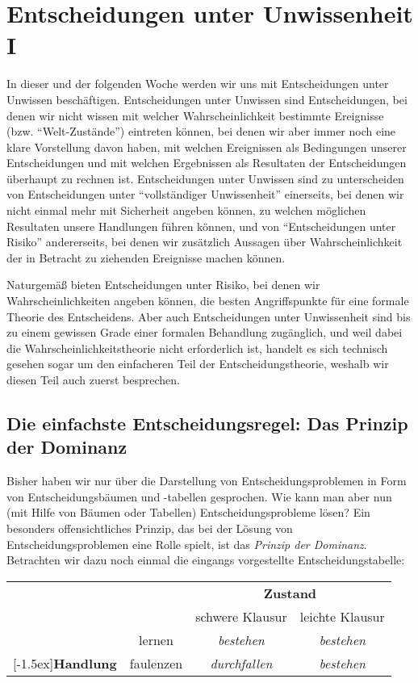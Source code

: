 \section{Entscheidungen unter Unwissenheit I}

In dieser und der folgenden Woche werden wir uns mit Entscheidungen unter
Unwissen beschäftigen. Entscheidungen unter Unwissen sind
Entscheidungen, bei denen wir nicht wissen mit welcher Wahrscheinlichkeit
bestimmte Ereignisse (bzw. "`Welt-Zustände"') eintreten können, bei denen wir
aber immer noch eine klare Vorstellung davon haben, mit welchen Ereignissen
als Bedingungen unserer Entscheidungen und mit welchen Ergebnissen als
Resultaten der Entscheidungen überhaupt zu rechnen ist. Entscheidungen unter
Unwissen sind zu unterscheiden von Entscheidungen unter "`vollständiger
Unwissenheit"' einerseits, bei denen wir nicht einmal mehr mit Sicherheit
angeben können, zu welchen möglichen Resultaten unsere Handlungen führen
können, und von "`Entscheidungen unter Risiko"' andererseits, bei denen wir
zusätzlich Aussagen über Wahrscheinlichkeit der in Betracht zu ziehenden
Ereignisse machen können. 

Naturgemäß bieten Entscheidungen unter Risiko, bei denen wir
Wahr\-schein\-lich\-keiten angeben können, die besten Angriffspunkte für eine
formale Theorie des Entscheidens. Aber auch Entscheidungen unter Unwissenheit
sind bis zu einem gewissen Grade einer formalen Behandlung zugänglich, und weil
dabei die Wahrscheinlichkeitstheorie nicht erforderlich ist, handelt es sich
technisch gesehen sogar um den einfacheren Teil der Entscheidungstheorie, weshalb
wir diesen Teil auch zuerst besprechen.

\subsection{Die einfachste Entscheidungsregel: Das Prinzip der Dominanz}
\label{DominanzPrinzip}
Bisher haben wir nur über die Darstellung von Entscheidungsproblemen in Form von
Entscheidungsbäumen und -tabellen gesprochen. Wie kann man aber nun (mit Hilfe
von Bäumen oder Tabellen) Entscheidungsprobleme lösen? Ein besonders
offensichtliches Prinzip, das bei der Lösung von Entscheidungsproblemen eine
Rolle spielt, ist das {\em Prinzip der Dominanz}. Betrachten wir dazu noch
einmal die eingangs vorgestellte Entscheidungstabelle:

\begin{center}
\begin{tabular}{cc|c|c|}
& \multicolumn{1}{c}{} & \multicolumn{2}{c}{{\bf Zustand}} \\
&           & schwere Klausur   & leichte Klausur    \\ \cline{2-4}
& lernen    & {\em bestehen}    &  {\em bestehen}    \\ \cline{2-4}
\raisebox{1.5ex}[-1.5ex]{{\bf Handlung}} 
& faulenzen & {\em durchfallen} &  {\em bestehen} \\
\cline{2-4}
\end{tabular}
\end{center}

